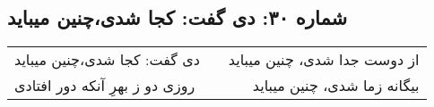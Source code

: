 \begin{center}
\section*{شماره ۳۰: دی گفت: کجا شدی،‌چنین میباید}
\label{sec:030}
\begin{longtable}{l p{0.5cm} r}
دی گفت: کجا شدی،‌چنین میباید
&&
از دوست جدا شدی، چنین میباید
\\
روزی دو ز بهرِ آنکه دور افتادی
&&
بیگانه زما شدی، چنین میباید
\\
\end{longtable}
\end{center}
